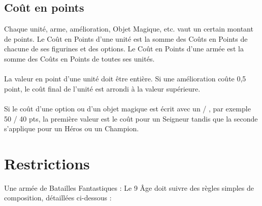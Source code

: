 \subsection{Coût en points}

Chaque unité, arme, amélioration, Objet Magique, etc. vaut un certain montant de points. Le Coût en Points d'une unité est la somme des Coûts en Points de chacune de ses figurines et des options. Le Coût en Points d'une armée est la somme des Coûts en Points de toutes ses unités.

\paragraph{}

La valeur en point d'une unité doit être entière. Si une amélioration coûte 0,5 point, le coût final de l'unité est arrondi à la valeur supérieure.

\paragraph{}

Si le coût d'une option ou d'un objet magique est écrit avec un \og / \fg{}, par exemple 50 / 40 pts, la première valeur est le coût pour un Seigneur tandis que la seconde s'applique pour un Héros ou un Champion.

\section{Restrictions}

Une armée de Batailles Fantastiques : Le 9\ieme{} Âge doit suivre des règles simples de composition, détaillées ci-dessous :

